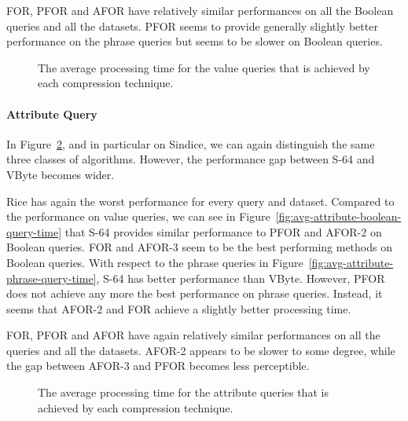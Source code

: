 FOR, PFOR and AFOR have relatively similar performances on all the Boolean
queries and all the datasets. PFOR seems to provide generally slightly better
performance on the phrase queries but seems to be slower on Boolean queries.

\begin{figure}
  \centering
  \quad%
	\caption{The average processing time for the value queries that is achieved
	by each compression technique.}
	\label{fig:avg-value-query-time}
\end{figure}

\paragraph{Attribute Query}

In Figure~\ref{fig:avg-attribute-query-time}, and in particular on Sindice, we
can again distinguish the same three classes of algorithms. However, the
performance gap between S-64 and VByte becomes wider.

Rice has again the worst performance for every query and dataset. Compared to
the performance on value queries, we can see in
Figure~\ref{fig:avg-attribute-boolean-query-time} that S-64 provides similar
performance to PFOR and AFOR-2 on Boolean queries. FOR and AFOR-3 seem to be
the best performing methods on Boolean queries. With respect to the phrase
queries in Figure~\ref{fig:avg-attribute-phrase-query-time}, S-64 has better
performance than VByte. However, PFOR does not achieve any more the best
performance on phrase queries. Instead, it seems that AFOR-2 and FOR achieve a
slightly better processing time.

FOR, PFOR and AFOR have again relatively similar performances on all the
queries and all the datasets. AFOR-2 appears to be slower to some degree,
while the gap between AFOR-3 and PFOR becomes less perceptible.

\begin{figure}
  \centering
  \quad%
	\caption{The average processing time for the attribute queries that is
	achieved by each compression technique.}
	\label{fig:avg-attribute-query-time}
\end{figure}

